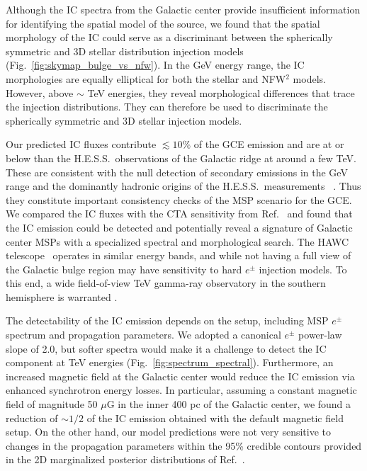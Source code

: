 \documentclass[doublespace,nopageskip]{VTthesis} %
\begin{document}
Although the IC spectra from the Galactic center provide insufficient information for identifying the spatial model of the source, we found that the spatial morphology of the IC could serve as a discriminant between the spherically symmetric and 3D stellar distribution injection models (Fig.~\ref{fig:skymap_bulge_vs_nfw}). In the GeV energy range, the IC morphologies are equally elliptical for both the stellar and NFW$^2$ models. However, above $\sim$ TeV energies, they reveal morphological differences that trace the injection distributions. They can therefore be used to discriminate the spherically symmetric and 3D stellar injection models.

Our predicted IC fluxes contribute $\lesssim 10 \%$ of the GCE emission and are at or below than the H.E.S.S.~observations of the Galactic ridge at around a  few TeV. These are consistent with the null detection of secondary emissions in the GeV range \cite{Lacroix:2015wfx} and the dominantly hadronic origins of the H.E.S.S.~measurements ~\cite{Gaggero:2017jts,Abramowski:2016mir}. Thus they constitute important consistency checks of the MSP scenario for the GCE. We compared the IC fluxes with the CTA sensitivity from Ref.~\cite{Silverwood:2014yza} and found that the IC emission could be detected and potentially reveal a signature of Galactic center MSPs with a specialized spectral and morphological search. The HAWC telescope~\cite{DeYoung:2012mj,Abeysekara:2013tka} operates in similar energy bands, and while not having a full view of the Galactic bulge region may have sensitivity to hard $e^\pm$ injection models. To this end, a wide field-of-view TeV gamma-ray observatory in the southern hemisphere is warranted \cite{Mostafa:2017fza}.

The detectability of the IC emission depends on the setup, including MSP $e^\pm$ spectrum and propagation parameters. We adopted a canonical $e^\pm$ power-law slope of 2.0, but softer spectra would make it a challenge to detect the IC component at TeV energies (Fig.~\ref{fig:spectrum_spectral}). Furthermore, an increased magnetic field at the Galactic center would reduce the IC emission via enhanced synchrotron energy losses. In particular, assuming a constant magnetic field of magnitude 50 $\mu$G in the inner 400 pc of the Galactic center, we found a reduction of $\sim 1/2$ of the IC emission obtained with the default magnetic field setup. On the other hand, our model predictions were not very sensitive to changes in the propagation parameters within the 95\% credible contours provided in the 2D marginalized posterior distributions of Ref.~\cite{Johannesson:2016rlh}.
\end{document}
